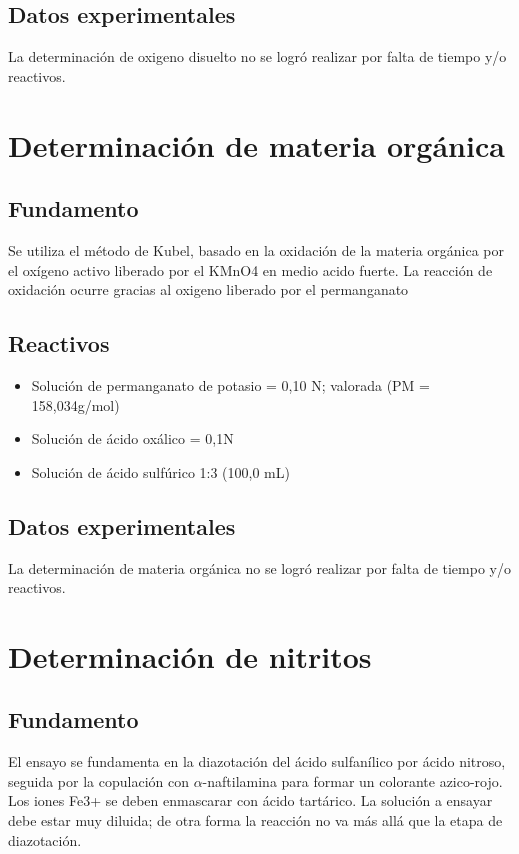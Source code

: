 \documentclass[a4paper,12pt]{article} %
\begin{document}
\subsection{Datos experimentales} 
La determinación de oxigeno disuelto no se logró realizar por falta de tiempo y/o reactivos. 



\newpage

\section{Determinación de materia orgánica}

\subsection{Fundamento}
Se utiliza el método de Kubel, basado en la oxidación de la materia orgánica por el oxígeno activo liberado por el KMnO4 en medio acido fuerte. La reacción de oxidación ocurre gracias al oxigeno liberado por el permanganato 

\subsection{Reactivos} 
\begin{itemize}
    \item{Solución de permanganato de potasio = 0,10 N; valorada (PM = 158,034g/mol)} 
    \item{Solución de ácido oxálico = 0,1N}  
    \item{Solución de ácido sulfúrico 1:3 (100,0 mL)}  
\end{itemize}

\subsection{Datos experimentales} 
La determinación de materia orgánica no se logró realizar por falta de tiempo y/o reactivos. 



\newpage

\section{Determinación de nitritos} 

\subsection{Fundamento} 
El ensayo se fundamenta en la diazotación del ácido sulfanílico por ácido nitroso, seguida por la copulación con $\alpha$-naftilamina para formar un colorante azico-rojo. Los iones Fe3+ se deben enmascarar con ácido tartárico. La solución a ensayar debe estar muy diluida; de otra forma la reacción no va más allá que la etapa de diazotación.
\end{document}
